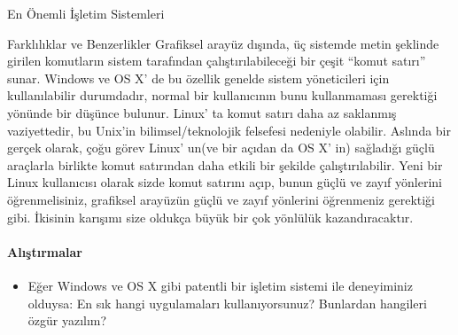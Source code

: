 \documentclass[10pt,a5paper]{book}
\begin{document}
\begin{section}{En Önemli İşletim Sistemleri}
\begin{subsection}{Farklılıklar ve Benzerlikler}
Grafiksel arayüz dışında, üç sistemde metin şeklinde girilen komutların sistem tarafından çalıştırılabileceği bir çeşit “komut satırı” sunar. Windows ve OS X' de bu özellik genelde sistem yöneticileri için kullanılabilir durumdadır, normal bir kullanıcının bunu kullanmaması gerektiği yönünde bir düşünce bulunur. Linux' ta komut satırı daha az saklanmış vaziyettedir, bu Unix'in bilimsel/teknolojik felsefesi nedeniyle olabilir. Aslında bir gerçek olarak, çoğu görev Linux' un(ve bir açıdan da OS X' in) sağladığı güçlü araçlarla birlikte komut satırından daha etkili bir şekilde çalıştırılabilir. Yeni bir Linux kullanıcısı olarak sizde komut satırını açıp, bunun güçlü ve zayıf yönlerini öğrenmelisiniz, grafiksel arayüzün güçlü ve zayıf yönlerini öğrenmeniz gerektiği gibi. İkisinin karışımı size oldukça büyük bir çok yönlülük kazandıracaktır.
\paragraph{Alıştırmalar}{
\begin{itemize}
 \item Eğer Windows ve OS X gibi patentli bir işletim sistemi ile deneyiminiz olduysa: En sık hangi uygulamaları kullanıyorsunuz? Bunlardan hangileri özgür yazılım?
\end{itemize}}
\end{subsection}
\end{section}
\end{document}
